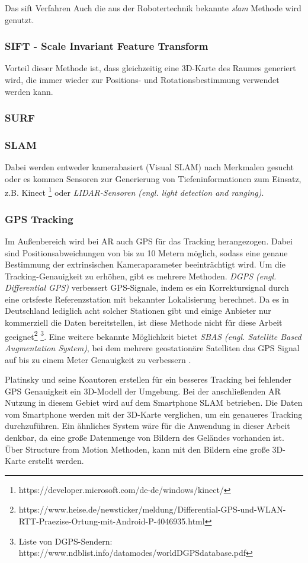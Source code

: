 Das \acrshort{sift} Verfahren Auch die aus der Robotertechnik bekannte \textit{\acrlong{slam}}\cite{slam1} \cite{slam2} Methode wird genutzt. 

\subsubsection{SIFT - Scale Invariant Feature Transform}
Vorteil dieser Methode ist, dass gleichzeitig eine 3D-Karte des Raumes generiert wird, die immer wieder zur Positions- und Rotationsbestimmung verwendet werden kann.

\subsubsection*{SURF}

\subsubsection*{SLAM}
Dabei werden entweder kamerabasiert (Visual SLAM) nach Merkmalen gesucht oder es kommen Sensoren zur Generierung von Tiefeninformationen zum Einsatz, z.B. Kinect \footnote{https://developer.microsoft.com/de-de/windows/kinect/} oder \textit{LIDAR-Sensoren (engl. light detection and ranging)}\cite{Liu2020}.

\subsubsection{GPS Tracking}
\label{tracking-gps-tracking}
Im Außenbereich wird bei AR auch GPS für das Tracking herangezogen. Dabei sind Positionsabweichungen von bis zu 10 Metern möglich, sodass eine genaue Bestimmung der extrinsischen Kameraparameter beeinträchtigt wird. Um die Tracking-Genauigkeit zu erhöhen, gibt es mehrere Methoden. \textit{DGPS (engl. Differential GPS)} verbessert GPS-Signale, indem es ein Korrektursignal durch eine ortsfeste Referenzstation mit bekannter Lokalisierung berechnet. Da es in Deutschland lediglich acht solcher Stationen gibt und einige Anbieter nur kommerziell die Daten bereitstellen, ist diese Methode nicht für diese Arbeit geeignet\footnote{https://www.heise.de/newsticker/meldung/Differential-GPS-und-WLAN-RTT-Praezise-Ortung-mit-Android-P-4046935.html} \footnote{Liste von DGPS-Sendern: https://www.ndblist.info/datamodes/worldDGPSdatabase.pdf}. Eine weitere bekannte Möglichkeit bietet \textit{SBAS (engl. Satellite Based Augmentation System)}, bei dem mehrere geostationäre Satelliten das GPS Signal auf bis zu einem Meter Genauigkeit zu verbessern \cite*{doerner}.

Platinsky und seine Koautoren\cite{platinsky} erstellen für ein besseres Tracking bei fehlender GPS Genauigkeit ein 3D-Modell der Umgebung. Bei der anschließenden AR Nutzung in diesem Gebiet wird auf dem Smartphone SLAM betrieben. Die Daten vom Smartphone werden mit der 3D-Karte verglichen, um ein genaueres Tracking durchzuführen. Ein ähnliches System wäre für die Anwendung in dieser Arbeit denkbar, da eine große Datenmenge von Bildern des Geländes vorhanden ist. Über Structure from Motion Methoden, kann mit den Bildern eine große 3D-Karte erstellt werden.